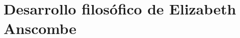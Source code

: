 \documentclass[./main.tex]{subfiles}
\begin{document}
\setcounter{chapter}{2}
\chapter{
Desarrollo filosófico de Elizabeth Anscombe
}







%

%
\end{document}
